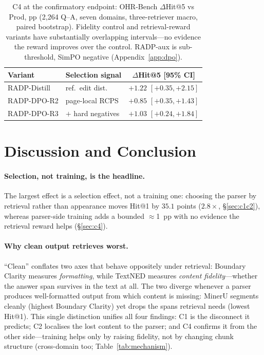 \documentclass[11pt]{article}
\newcommand{\rcps}{\textsc{RCPS}}
\begin{document}
\begin{table}[t]
\centering\scriptsize
\setlength{\tabcolsep}{2.5pt}
\begin{tabular}{llc}
\toprule
Variant & Selection signal & $\Delta$Hit@5 [95\% CI] \\
\midrule
RADP-Distill & ref.\ edit dist. & $\mathbf{+1.22}$ $[{+}0.35, {+}2.15]$ \\
RADP-DPO-R2 & page-local \rcps{} & $+0.85$ $[{+}0.35, {+}1.43]$ \\
RADP-DPO-R3 & $+$ hard negatives & $+1.03$ $[{+}0.24, {+}1.84]$ \\
\bottomrule
\end{tabular}
\caption{C4 at the confirmatory endpoint: OHR-Bench $\Delta$Hit@5 vs Prod, pp (2{,}264 Q--A, seven domains, three-retriever macro, paired bootstrap). Fidelity control and retrieval-reward variants have substantially overlapping intervals---no evidence the reward improves over the control. RADP-aux is sub-threshold, SimPO negative (Appendix~\ref{app:dpo}).}
\label{tab:c4}
\end{table}

\section{Discussion and Conclusion}

\paragraph{Selection, not training, is the headline.} The largest effect is a selection effect, not a training one: choosing the parser by retrieval rather than appearance moves Hit@1 by $35.1$ points ($2.8\times$, \S\ref{sec:c1c2}), whereas parser-side training adds a bounded $\approx$1~pp with no evidence the retrieval reward helps (\S\ref{sec:c4}).

\paragraph{Why clean output retrieves worst.} ``Clean'' conflates two axes that behave oppositely under retrieval: Boundary Clarity measures \emph{formatting}, while TextNED measures \emph{content fidelity}---whether the answer span survives in the text at all. The two diverge whenever a parser produces well-formatted output from which content is missing: MinerU segments cleanly (highest Boundary Clarity) yet drops the spans retrieval needs (lowest Hit@1). This single distinction unifies all four findings: C1 is the disconnect it predicts; C2 localises the lost content to the parser; and C4 confirms it from the other side---training helps only by raising fidelity, not by changing chunk structure (cross-domain too; Table~\ref{tab:mechanism}).
\end{document}
